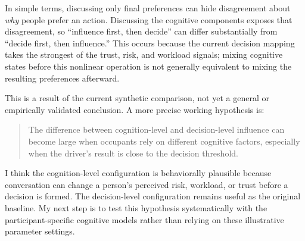 \documentclass[11pt]{article}
\begin{document}
In simple terms, discussing only final preferences can hide disagreement about
\emph{why} people prefer an action.  Discussing the cognitive components exposes
that disagreement, so ``influence first, then decide'' can differ substantially
from ``decide first, then influence.''  This occurs because the current
decision mapping takes the strongest of the trust, risk, and workload signals;
mixing cognitive states before this nonlinear operation is not generally
equivalent to mixing the resulting preferences afterward.

This is a result of the current synthetic comparison, not yet a general or
empirically validated conclusion.  A more precise working hypothesis is:

\begin{quote}
The difference between cognition-level and decision-level influence can become
large when occupants rely on different cognitive factors, especially when the
driver's result is close to the decision threshold.
\end{quote}

I think the cognition-level configuration is behaviorally plausible because
conversation can change a person's perceived risk, workload, or trust before a
decision is formed.  The decision-level configuration remains useful as the
original baseline.  My next step is to test this hypothesis systematically
with the participant-specific cognitive models rather than relying on these
illustrative parameter settings.
\end{document}
